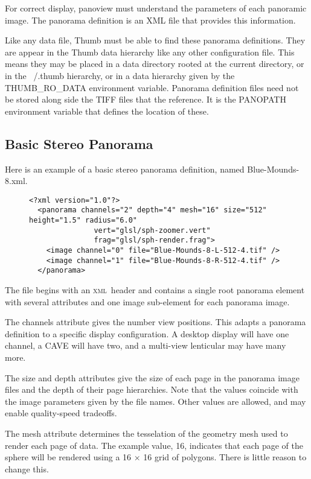 \documentclass[article,twocolumn,10pt]{memoir}
\newcommand{\xml}     {\textsc{xml}}
\begin{document}
\begin{Spacing}{1.1}
For correct display, panoview must understand the parameters of each panoramic image. The panorama definition is an XML file that provides this information.

Like any data file, Thumb must be able to find these panorama definitions. They are appear in the Thumb data hierarchy like any other configuration file. This means they may be placed in a data directory rooted at the current directory, or in the ~/.thumb hierarchy, or in a data hierarchy given by the THUMB\_RO\_DATA environment variable. Panorama definition files need not be stored along side the TIFF files that the reference. It is the PANOPATH environment variable that defines the location of these.

\subsection{Basic Stereo Panorama}

Here is an example of a basic stereo panorama definition, named Blue-Mounds-8.xml.

\begin{figure*}
\begin{verbatim}
<?xml version="1.0"?>
  <panorama channels="2" depth="4" mesh="16" size="512" height="1.5" radius="6.0"
               vert="glsl/sph-zoomer.vert"
               frag="glsl/sph-render.frag">
    <image channel="0" file="Blue-Mounds-8-L-512-4.tif" />
    <image channel="1" file="Blue-Mounds-8-R-512-4.tif" />
  </panorama>
\end{verbatim}
\end{figure*}

The file begins with an \xml\ header and contains a single root panorama element with several attributes and one image sub-element for each panorama image.

The channels attribute gives the number view positions. This adapts a panorama definition to a specific display configuration. A desktop display will have one channel, a CAVE will have two, and a multi-view lenticular may have many more.

The size and depth attributes give the size of each page in the panorama image files and the depth of their page hierarchies. Note that the values coincide with the image parameters given by the file names. Other values are allowed, and may enable quality-speed tradeoffs.

The mesh attribute determines the tesselation of the geometry mesh used to render each page of data. The example value, 16, indicates that each page of the sphere will be rendered using a 16 × 16 grid of polygons. There is little reason to change this.


\end{Spacing}
\end{document}
